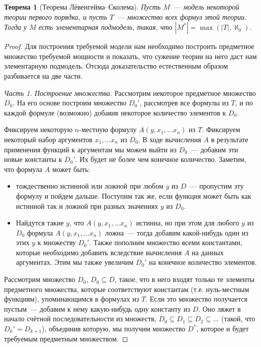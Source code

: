 \documentclass[a4paper,11pt]{article}
\newtheorem{thm}{Теорема}[section]
\theoremstyle{definition}
\begin{document}
\begin{thm}[Теорема Лёвенгейма--Сколема]
Пусть $M$~--- модель некоторой теории первого порядка, и пусть $T$~--- множество
всех формул этой теории. Тогда у $M$ есть элементарная подмодель, такая, что
$|M^*| = \max(|T|, \aleph_0)$.
\end{thm}
\begin{proof}
Для построения требуемой модели нам необходимо построить предметное множество
требуемой мощности и показать, что сужение теории на него даст нам элементарную
подмодель. Отсюда доказательство естественным образом разбивается на две части.

\emph{Часть 1. Построение множества.} Рассмотрим некоторое предметное множество
$D_0$. На его основе построим множество $D_0'$, рассмотрев все формулы из $T$, и
по каждой формуле (возможно) добавив некоторое количество элементов к $D_0$.

Фиксируем некоторую $n$-местную формулу $A(y, x_1, \dots x_n)$ из $T$.
Фиксируем некоторый набор аргументов $x_1, \dots x_n$ из $D_0$. В ходе
вычисления $A$ в результате применения функций к аргументам мы можем выйти из
$D_0$~--- добавим эти новые константы к $D_0'$. Их будет не более чем конечное
количество. Заметим, что формула $A$ может быть:
\begin{itemize}
\item тождественно истинной или ложной при любом $y$ из $D$~--- пропустим эту
  формулу и пойдем дальше. Поступим так же, если функция может быть как истинной
  так и ложной при разных значениях $y$ из $D_0$.
\item Найдутся такие $y$, что $A(y, x_1, \dots x_n)$ истинна, но при этом для
  любого $y$ из $D_0$ формула $A(y, x_1, \dots x_n)$ ложна~--- тогда добавим
  какой-нибудь один из этих $y$ к множеству $D_0'$. Также пополним множество
  всеми константами, которые необходимо добавить вследствие вычисления $A$ на
  данных аргументах. Этим мы также увеличим $D_0'$ на конечное количество
  элементов.
\end{itemize}

Рассмотрим множество $D_0$, $D_0 \subseteq D$, такое, что в него входят только те
элементы предметного множества, которые соответствуют константам (т.е.
нуль-местным функциям), упоминающимся в формулах из $T$. Если это множество
получается пустым~--- добавим к нему какую-нибудь одну константу из $D$. Оно
ляжет в начало счётной последовательности из множеств, $D_0 \subseteq D_1
\subseteq D_2 \subseteq \dots$ (такой, что $D_k' = D_{k+1}$), объединив которую,
мы получим множество $D^*$, которое и будет требуемым предметным множеством.


\end{proof}
\end{document}
